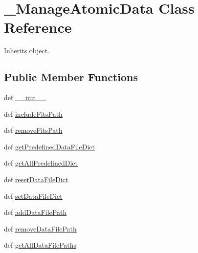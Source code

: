 \hypertarget{classpyneb_1_1utils_1_1manage__atomic__data_1_1___manage_atomic_data}{\section{\-\_\-\-Manage\-Atomic\-Data Class Reference}
\label{classpyneb_1_1utils_1_1manage__atomic__data_1_1___manage_atomic_data}
}


Inherits object.

\subsection*{Public Member Functions}
\begin{DoxyCompactItemize}
\item 
def \hyperlink{classpyneb_1_1utils_1_1manage__atomic__data_1_1___manage_atomic_data_ac775ee34451fdfa742b318538164070e}{\-\_\-\-\_\-init\-\_\-\-\_\-}
\item 
def \hyperlink{classpyneb_1_1utils_1_1manage__atomic__data_1_1___manage_atomic_data_a86745e5069d9a2a3e2e6bc4864205d50}{include\-Fits\-Path}
\item 
def \hyperlink{classpyneb_1_1utils_1_1manage__atomic__data_1_1___manage_atomic_data_abcfa630bfd62a3a1fa7c1e02145cad95}{remove\-Fits\-Path}
\item 
def \hyperlink{classpyneb_1_1utils_1_1manage__atomic__data_1_1___manage_atomic_data_a6c91ed7c30a4cd3ff5f5a92bacb4fe62}{get\-Predefined\-Data\-File\-Dict}
\item 
def \hyperlink{classpyneb_1_1utils_1_1manage__atomic__data_1_1___manage_atomic_data_ac982c4be5fede77fee0aa8323904b911}{get\-All\-Predefined\-Dict}
\item 
def \hyperlink{classpyneb_1_1utils_1_1manage__atomic__data_1_1___manage_atomic_data_a6f882b32998f4a471b1cf53065ef7f21}{reset\-Data\-File\-Dict}
\item 
def \hyperlink{classpyneb_1_1utils_1_1manage__atomic__data_1_1___manage_atomic_data_ab4c2e82049bd88582e31e53028cd8f76}{set\-Data\-File\-Dict}
\item 
def \hyperlink{classpyneb_1_1utils_1_1manage__atomic__data_1_1___manage_atomic_data_aa3c20cfbde4bd16d8b2e28feeafd4a0e}{add\-Data\-File\-Path}
\item 
def \hyperlink{classpyneb_1_1utils_1_1manage__atomic__data_1_1___manage_atomic_data_a302db5fb2db9a6aec05b81ddbf1646d9}{remove\-Data\-File\-Path}
\item 
def \hyperlink{classpyneb_1_1utils_1_1manage__atomic__data_1_1___manage_atomic_data_a2cc52a794cb42ef70d9aa76092935139}{get\-All\-Data\-File\-Paths}

\end{DoxyCompactItemize}
